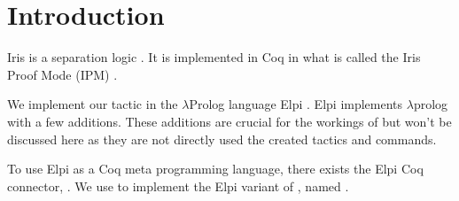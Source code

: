\documentclass[thesis.tex]{subfiles}
\begin{document}
\chapter{Introduction}
\label{ch:introduction}



Iris is a separation logic \cite*{jungIrisMonoidsInvariants2015a,jungHigherorderGhostState2016,krebbersEssenceHigherOrderConcurrent2017,jungIrisGroundModular2018}. It is implemented in Coq in what is called the Iris Proof Mode (IPM) \cite*{krebbersInteractiveProofsHigherorder2017,krebbersMoSeLGeneralExtensible2018}.

We implement our tactic in the $\lambda$Prolog language Elpi \cite{dunchevELPIFastEmbeddable2015,guidiImplementingTypeTheory2019}. Elpi implements $\lambda$prolog \cite{millerHigherorderLogicProgramming1986,millerUniformProofsFoundation1991,belleanneePragmaticReconstructionLProlog1999,millerProgrammingHigherOrderLogic2012} with a few additions. These additions are crucial for the workings of \ce but won't be discussed here as they are not directly used the created tactics and commands.

To use Elpi as a Coq meta programming language, there exists the Elpi Coq connector, \ce \cite{tassiElpiExtensionLanguage2018}. We use \ce to implement the Elpi variant of , named .
\end{document}
